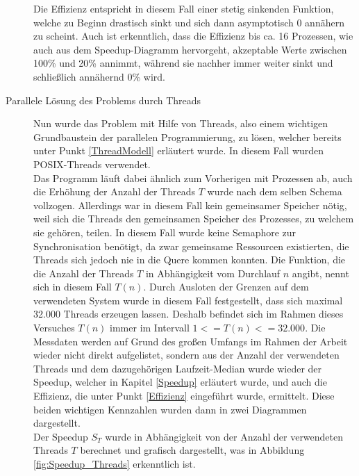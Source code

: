 \begin{description}
						Die Effizienz entspricht in diesem Fall einer stetig sinkenden Funktion, welche zu Beginn drastisch sinkt und sich dann asymptotisch 0 annähern zu scheint. Auch ist erkenntlich, dass die Effizienz bis ca. 16 Prozessen, wie auch aus dem Speedup-Diagramm hervorgeht, akzeptable Werte zwischen 100\% und 20\% annimmt, während sie nachher immer weiter sinkt und schließlich annähernd 0\% wird.
					
					\item[Parallele Lösung des Problems durch Threads]
						
						Nun wurde das Problem mit Hilfe von Threads, also einem wichtigen Grundbaustein der parallelen Programmierung, zu lösen, welcher bereits unter Punkt \ref{ThreadModell} erläutert wurde. In diesem Fall wurden POSIX-Threads verwendet.\\
						Das Programm läuft dabei ähnlich zum Vorherigen mit Prozessen ab, auch die Erhöhung der Anzahl der Threads $T$ wurde nach dem selben Schema vollzogen. Allerdings war in diesem Fall kein gemeinsamer Speicher nötig, weil sich die Threads den gemeinsamen Speicher des Prozesses, zu welchem sie gehören, teilen. In diesem Fall wurde keine Semaphore zur Synchronisation benötigt, da zwar gemeinsame Ressourcen existierten, die Threads sich jedoch nie in die Quere kommen konnten. Die Funktion, die die Anzahl der Threads $T$ in Abhängigkeit vom Durchlauf $n$ angibt, nennt sich in diesem Fall $T(n)$.
						Durch Ausloten der Grenzen auf dem verwendeten System wurde in diesem Fall festgestellt, dass sich maximal 32.000 Threads erzeugen lassen. Deshalb befindet sich im Rahmen dieses Versuches $T(n)$ immer im Intervall $1 <= T(n) <= 32.000$.
						Die Messdaten werden auf Grund des großen Umfangs im Rahmen der Arbeit wieder nicht direkt aufgelistet, sondern aus der Anzahl der verwendeten Threads und dem dazugehörigen Laufzeit-Median wurde wieder der Speedup, welcher in Kapitel \ref{Speedup} erläutert wurde, und auch die Effizienz, die unter Punkt \ref{Effizienz} eingeführt wurde, ermittelt. Diese beiden wichtigen Kennzahlen wurden dann in zwei Diagrammen dargestellt.\\
						Der Speedup $S_T$ wurde in Abhängigkeit von der Anzahl der verwendeten Threads $T$ berechnet und grafisch dargestellt, was in Abbildung \ref{fig:Speedup_Threads} erkenntlich ist.
						

\end{description}
